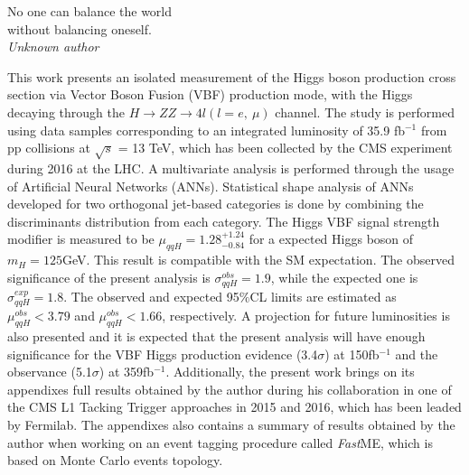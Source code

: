 \documentclass[a4paper,12pt,oneside,onecolumn,final,fleqn]{repUERJ}
\begin{document}
\pretextualchapter{}
\vfill
\begin{flushright}
No one can balance the world\\ 
without balancing oneself.\\
\textit{Unknown author}
\end{flushright}

This work presents an isolated measurement of the Higgs boson production cross section via Vector Boson Fusion (VBF) production mode, with the Higgs decaying through the $H \rightarrow ZZ \rightarrow 4l (l=e,~\mu)$ channel. The study is performed using data samples corresponding to an integrated luminosity of 35.9 fb$^{-1}$ from pp collisions at $\sqrt{s}$ = 13 TeV, which has been collected by the CMS experiment during 2016 at the LHC. A multivariate analysis is performed through the usage of Artificial Neural Networks (ANNs). Statistical shape analysis of ANNs developed for two orthogonal jet-based categories is done by combining the discriminants distribution from each category. The Higgs VBF signal strength modifier is measured to be $\mu_{qqH} = 1.28^{+1.24}_{-0.84}$ for a expected Higgs boson of $m_{H} = 125$GeV. This result is compatible with the SM expectation. The observed significance of the present analysis is $\sigma_{qqH}^{obs} = 1.9$, while the expected one is $\sigma_{qqH}^{exp} = 1.8$. The observed and expected 95$\%$CL limits are estimated as $\mu_{qqH}^{obs} < 3.79$ and $\mu_{qqH}^{obs} < 1.66$, respectively. A projection for future luminosities is also presented and it is expected that the present analysis will have enough significance for the VBF Higgs production evidence (3.4$\sigma$) at 150fb$^{-1}$ and the observance (5.1$\sigma$) at 359fb$^{-1}$. Additionally, the present work brings on its appendixes full results obtained by the author during his collaboration in one of the CMS L1 Tacking Trigger approaches in 2015 and 2016, which has been leaded by Fermilab. The appendixes also contains a summary of results obtained by the author when working on an event tagging procedure called \textit{Fast}ME, which is based on Monte Carlo events topology.

\printkeys %
\end{document}
